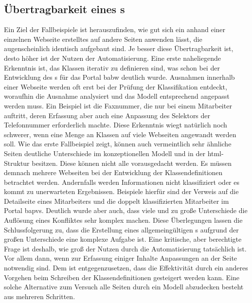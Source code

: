 \subsection{Übertragbarkeit eines {\classificationModel}s}
    Ein Ziel der Fallbeispiele ist herauszufinden,
    wie gut sich ein anhand einer einzelnen Webseite
    erstelltes {\classificationModel} auf andere Seiten anwenden lässt,
    die augenscheinlich identisch aufgebaut sind.
    Je besser diese Übertragbarkeit ist,
    desto höher ist der Nutzen der Automatisierung.
    Eine erste naheliegende Erkenntnis ist,
    das Klassen iterativ zu definieren sind,
    was schon bei der Entwicklung des {\classificationModel}s
    für das Portal \gls{babw} deutlich wurde.
    Ausnahmen innerhalb einer Webseite werden oft erst
    bei der Prüfung der Klassifikation entdeckt,
    woraufhin die Ausnahme analysiert und das Modell
    entsprechend angepasst werden muss.
    Ein Beispiel ist die Faxnummer, die nur bei einem Mitarbeiter auftritt,
    deren Erfassung aber auch eine Anpassung des Selektors der Telefonnummer
    erforderlich machte.
    Diese Erkenntnis wiegt natürlich noch schwerer,
    wenn eine Menge an Klassen auf viele Webseiten angewandt werden soll.
    Wie das erste Fallbeispiel zeigt,
    können auch vermeintlich sehr ähnliche Seiten deutliche Unterschiede
    im konzeptionellen Modell und in der \gls{html}-Struktur besitzen.
    Diese können nicht alle vorausgedacht werden.
    Es müssen demnach mehrere Webseiten bei der Entwicklung der Klassendefinitionen
    betrachtet werden.
    Andernfalls werden Informationen nicht klassifiziert oder es kommt zu unerwarteten Ergebnissen.
    Beispiele hierfür sind der Verweis auf die Detailseite eines Mitarbeiters
    und die doppelt klassifizierten Mitarbeiter im Portal \gls{bapvs}.
    Deutlich wurde aber auch, dass viele und zu große Unterschiede
    die Auflösung eines Konfliktes sehr komplex machen.
    Diese Überlegungen lassen die Schlussfolgerung zu,
    dass die Erstellung eines allgemeingültigen {\classificationModel}s
    aufgrund der großen Unterschiede eine komplexe Aufgabe ist.
    Eine kritische, aber berechtigte Frage ist deshalb,
    wie groß der Nutzen durch die Automatisierung tatsächlich ist.
    Vor allem dann, wenn zur Erfassung einiger Inhalte Anpassungen an der Seite notwendig sind.
    Dem ist entgegenzusetzen, dass die Effektivität durch ein anderes Vorgehen beim
    Schreiben der Klassendefinitionen gesteigert werden kann.
    Eine solche Alternative zum Versuch alle Seiten durch ein Modell abzudecken
    besteht aus mehreren Schritten.
